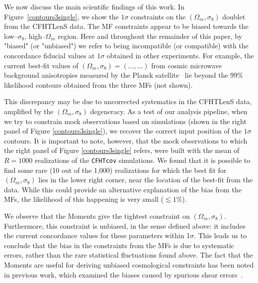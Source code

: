 \documentclass[reprint,aps,prd,superscriptaddress,showkeys,showpacs]{revtex4-1}
\begin{document}
We now discuss the main scientific findings of this work. In
Figure~\ref{contours3single}, we show the $1\sigma$ constraints on the
$(\Omega_m,\sigma_8)$ doublet from the CFHTLenS data. The MF
constraints appear to be biased towards the low--$\sigma_8$,
high--$\Omega_m$ region. Here and throughout the remainder of this
paper, by "biased" (or "unbiased") we refer to being incompatible (or
compatible) with the concordance fiducial values at $1\sigma$ obtained
in other experiments. For example, the current best-fit values of
$(\Omega_m,\sigma_8)=(...,...)$ from cosmic microwave background
anisotropies measured by the Planck
satellite~\citep{PlanckXVI2013} lie beyond the 99\% likelihood
contours obtained from the three MFs (not shown).

This discrepancy may be due to uncorrected systematics in the CFHTLenS
data, amplified by the $(\Omega_m,\sigma_8)$ degeneracy.  As a test of
our analysis pipeline, when we try to constrain mock observations
based on simulations (shown in the
right panel of Figure \ref{contours3single}), we recover the correct
input position of the $1\sigma$ contours.  It is important to note,
however, that the mock observations to which the right panel of Figure
\ref{contours3single} refers, were built with the mean of $R=1000$
realizations of the \texttt{CFHTcov} simulations. We found that it is
possible to find some rare (10 out of the 1,000) realizations for
which the best fit for $(\Omega_m,\sigma_8)$ lies in the lower right
corner, near the location of the best-fit from the data. While this
could provide an alternative explanation of the bias from the MFs, the
likelihood of this happening is very small ($\lesssim1\%$).


We observe that the Moments give the tightest constraint on
$(\Omega_m,\sigma_8)$.  Furthermore, this constraint is unbiased, in
the sense defined above: it includes the current concordance values
for these parameters within 1$\sigma$.  This leads us to conclude that
the bias in the constraints from the MFs is due to systematic errors,
rather than the rare statistical fluctuations found above.
The fact that the Moments are useful for deriving unbiased
cosmological constraints has been noted in previous work, which
examined the biases caused by spurious shear
errors~\citep{PetriSpurious}.
\end{document}
